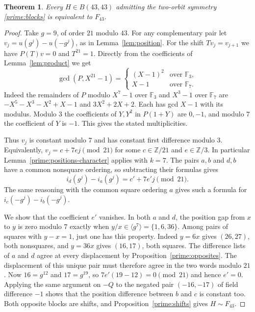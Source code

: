 \documentclass[11pt,a4paper]{article}
\newtheorem{theorem}{Theorem}[section]
\numberwithin{equation}{section}
\begin{document}
\begin{theorem}\label{prime:fortythree}
Every $H\in B(43,43)$ admitting the two-orbit symmetry \eqref{prime:blocks} is equivalent to $F_{43}$.
\end{theorem}
\begin{proof}
Take $g=9$, of order $21$ modulo $43$. For any complementary pair let $v_j=u(g^j)-u(-g^j)$, as in Lemma~\ref{lem:position}. For the shift $Tv_j=v_{j+1}$ we have $P(T)v=0$ and $T^{21}=1$. Directly from the coefficients of Lemma~\ref{lem:product} we get
\[
 \gcd(P,X^{21}-1)=
 \begin{cases}(X-1)^2&\text{over }\mathbb F_3,\\
                X-1&\text{over }\mathbb F_7.
 \end{cases}
\]
Indeed the remainders of $P$ modulo $X^7-1$ over $\mathbb F_3$ and $X^3-1$ over $\mathbb F_7$ are $-X^5-X^3-X^2+X-1$ and $3X^2+2X+2$. Each has gcd $X-1$ with its modulus. Modulo $3$ the coefficients of $Y,Y^2$ in $P(1+Y)$ are $0,-1$, and modulo $7$ the coefficient of $Y$ is $-1$. This gives the stated multiplicities.

Thus $v_j$ is constant modulo $7$ and has constant first difference modulo $3$. Equivalently, $v_j=c+7ej\pmod{21}$ for some $c\in\mathbb Z/21$ and $e\in\mathbb Z/3$. In particular Lemma~\ref{prime:positions-character} applies with $k=7$. The pairs $a,b$ and $d,b$ have a common nonsquare ordering, so subtracting their formulas gives
$$i_d(g^j)-i_a(g^j)=c'+7e'j\pmod{21}.$$
The same reasoning with the common square ordering $a$ gives such a formula for $i_c(-g^j)-i_b(-g^j)$.

We show that the coefficient $e'$ vanishes. In both $a$ and $d$, the position gap from $x$ to $y$ is zero modulo $7$ exactly when $y/x\in\langle g^7\rangle=\{1,6,36\}$. Among pairs of squares with $y-x=1$, just one has this property. Indeed $y=6x$ gives $(26,27)$, both nonsquares, and $y=36x$ gives $(16,17)$, both squares. The difference lists of $a$ and $d$ agree at every displacement by Proposition~\ref{prime:opposites}. The displacement of this unique pair must therefore agree in the two words modulo $21$. Now $16=g^{12}$ and $17=g^{19}$, so $7e'(19-12)=0\pmod{21}$ and hence $e'=0$. Applying the same argument on $-Q$ to the negated pair $(-16,-17)$ of field difference $-1$ shows that the position difference between $b$ and $c$ is constant too. Both opposite blocks are shifts, and Proposition~\ref{prime:shifts} gives $H\sim F_{43}$.
\end{proof}
\end{document}
